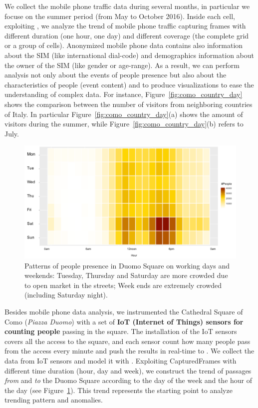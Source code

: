We collect the mobile phone traffic data during several months, in particular we focuse on the summer period (from May to October 2016). Inside each \textsf{cell}, exploiting \sparkdi{}, we analyze the trend of mobile phone traffic capturing \textsf{frame}s with different duration (one hour, one day) and different coverage (the complete grid or a group of cells). 
Anonymized mobile phone data contains also information about the SIM (like international dial-code) and demographics information about the owner of the SIM (like gender or age-range).
As a result, we can perform analysis not only about the \textsf{event}s of people presence but also about the characteristics of people (\textsf{event content}) and to produce visualizations to ease the understanding of complex data.
For instance, Figure~\ref{fig:como_country_day} shows the comparison between the number of visitors from neighboring countries of Italy.
In particular Figure~\ref{fig:como_country_day}(a) shows the amount of visitors during the summer, while Figure~\ref{fig:como_country_day}(b) refers to July.

\begin{figure} [t]
        \centering
        \includegraphics[width=.8\linewidth]{img/como-hourly-distribution}
        \caption{Patterns of people presence in Duomo Square on working days and weekends: Tuesday, Thursday and Saturday are more crowded due to open market in the streets; Week ends are extremely crowded (including Saturday night).}
        \label{fig:duomo}
\end{figure}

Besides mobile phone data analysis, we instrumented the Cathedral Square of Como (\textit{Piazza Duomo}) with a set of \textbf{IoT (Internet of Things) sensors for counting people} passing in the square. The installation of the IoT sensors covers all the access to the square, and each sensor count how many people pass from the access every minute and push the results in real-time to \sparkdi{}.
We collect the data from IoT sensors and model it with \frappe{}.
Exploiting \textsf{CapturedFrames} with different time duration (hour, day and week), we construct the trend of passages \emph{from} and \emph{to} the Duomo Square according to the day of the week and the hour of the day (see Figure~\ref{fig:duomo}). 
This trend represents the starting point to analyze trending pattern and anomalies. 

